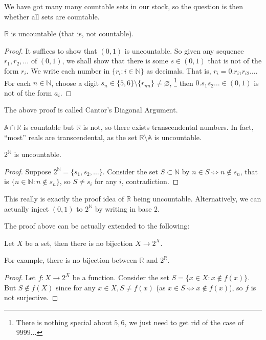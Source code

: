 We have got many many countable sets in our stock, so the question is then whether all sets are countable.
\begin{theorem}
    $\mathbb R$ is uncountable (that is, not countable).
\end{theorem}
\begin{proof}
    It suffices to show that $(0,1)$ is uncountable.
    So given any sequence $r_1,r_2,\ldots$ of $(0,1)$, we shall show that there is some $s\in (0,1)$ that is not of the form $r_i$.
    We write each number in $\{r_i:i\in\mathbb N\}$ as decimals.
    That is, $r_i=0.r_{i1}r_{i2}\ldots$.
    For each $n\in\mathbb N$, choose a digit $s_n\in\{5,6\}\setminus\{r_{nn}\}\neq\varnothing$,
    \footnote{There is nothing special about $5,6$, we just need to get rid of the case of $9999\ldots$}
    then $0.s_1s_2\ldots\in (0,1)$ is not of the form $a_i$.
\end{proof}
The above proof is called Cantor's Diagonal Argument.
\begin{remark}
    $\mathbb A\cap \mathbb R$ is countable but $\mathbb R$ is not, so there exists transcendental numbers.
    In fact, ``most'' reals are transcendental, as the set $\mathbb R\setminus\mathbb A$ is uncountable.
\end{remark}
\begin{theorem}
    $2^{\mathbb N}$ is uncountable.
\end{theorem}
\begin{proof}
    Suppose $2^{\mathbb N}=\{s_1,s_2,\ldots\}$.
    Consider the set $S\subset\mathbb N$ by $n\in S\iff n\notin s_n$, that is $\{n\in\mathbb N:n\notin s_n\}$, so $S\neq s_i$ for any $i$, contradiction.
\end{proof}
\begin{remark}
    This really is exactly the proof idea of $\mathbb R$ being uncountable.
    Alternatively, we can actually inject $(0,1)$ to $2^\mathbb N$ by writing in base $2$.
\end{remark}
The proof above can be actually extended to the following:
\begin{theorem}
    Let $X$ be a set, then there is no bijection $X\to 2^X$.
\end{theorem}
For example, there is no bijection between $\mathbb R$ and $2^{\mathbb R}$.
\begin{proof}
    Let $f:X\to 2^X$ be a function.
    Consider the set $S=\{x\in X:x\notin f(x)\}$.
    But $S\notin f(X)$ since for any $x\in X,S\neq f(x)$ (as $x\in S\iff x\notin f(x)$), so $f$ is not surjective.
\end{proof}
